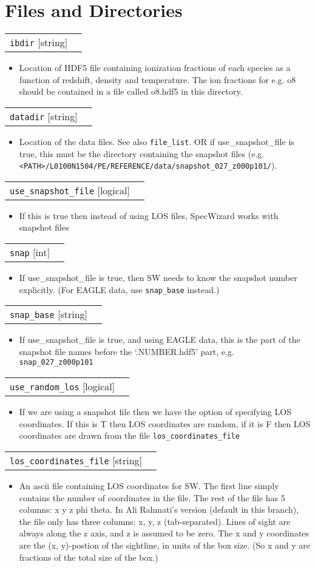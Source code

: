 \documentclass{report}
\makeatletter
\newcommand{\paramdefinition}[3]{
\begin{tabular*}{\textwidth}{l@{\extracolsep{\fill}}r}
		{\tt #1} [{\sc #2}]& #3 \\
\end{tabular*}}
\newcommand{\paramdescription}[1]{
\begin{itemize}
\item #1
\end{itemize}\vspace{0.2cm}}
\newcommand{\param}[1]{{\tt #1}}
\makeatother
\begin{document}
\section{Files and Directories}

\paramdefinition{ibdir}{string}{}
\paramdescription{Location of HDF5 file containing ionization fractions of each species as a function of redshift, density and temperature. The ion fractions for e.g. o8 should be contained in a file called o8.hdf5 in this directory.}

\paramdefinition{datadir}{string}{}
\paramdescription{Location of the data files.  See also \param{file\_list}.
OR if use\_snapshot\_file is true, this must be the directory containing the snapshot files (e.g. \param{<PATH>/L0100N1504/PE/REFERENCE/data/snapshot\_027\_z000p101/}).}

\paramdefinition{use\_snapshot\_file}{logical}{}
\paramdescription{If this is true then instead of using LOS files, SpecWizard works with snapshot files}

\paramdefinition{snap}{int}{}
\paramdescription{If use\_snapshot\_file is true, then SW needs to know the snapshot number explicitly. (For EAGLE data, use \param{snap\_base} instead.)}

\paramdefinition{snap\_base}{string}{}
\paramdescription{If use\_snapshot\_file is true, and using EAGLE data, this is the part of the snapshot file names before the `.NUMBER.hdf5' part, e.g. \param{snap\_027\_z000p101}}

\paramdefinition{use\_random\_los}{logical}{}
\paramdescription{If we are using a snapshot file then we have the option of specifying LOS coordinates.  If this is T then LOS coordinates are random, if it is F then LOS coordinates are drawn from the file {\tt los\_coordinates\_file}}

\paramdefinition{los\_coordinates\_file}{string}{}
\paramdescription{An ascii file containing LOS coordinates for SW. The first line simply contains the number of coordinates in the file. The rest of the file has 5 columns: x y z phi theta. In Ali Rahmati's version (default in this branch), the file only has three columns: x, y, z (tab-separated). Lines of sight are always along the z axis, and z is assumed to be zero. The x and y coordinates are the (x, y)-postion of the sightline, in units of the box size. (So x and y are fractions of the total size of the box.)}
\end{document}

